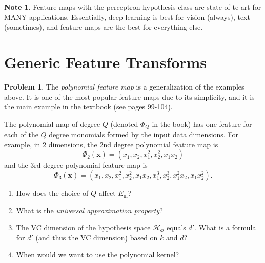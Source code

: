 \documentclass[10pt]{exam}
\theoremstyle{definition}
\newtheorem{problem}{Problem}
\newtheorem{note}{Note}
\newcommand{\Ein}{E_{\text{in}}}
\newcommand{\x}{\mathbf x}
\newcommand{\HH}[1]{\mathcal H_{\text{#1}}}
\begin{document}
\vspace{6in}
\begin{note}
    Feature maps with the perceptron hypothesis class are state-of-te-art for MANY applications.
    Essentially, deep learning is best for vision (always), text (sometimes), and feature maps are the best for everything else.
\end{note}

\newpage
\section*{Generic Feature Transforms}

\begin{problem}
    The \emph{polynomial feature map} is a generalization of the examples above.
    It is one of the most popular feature maps due to its simplicity,
    and it is the main example in the textbook (see pages 99-104).

    The polynomial map of degree $Q$ (denoted $\Phi_Q$ in the book) has one feature for each of the $Q$ degree monomials formed by the input data dimensions.
    For example, in 2 dimensions, the 2nd degree polynomial feature map is
    \begin{equation}
        \Phi_2(\x) = (x_1, x_2, x_1^2, x_2^2, x_1x_2)
    \end{equation}
    and the 3rd degree polynomial feature map is
    \begin{equation}
        \Phi_3(\x) = (x_1, x_2, x_1^2, x_2^2, x_1x_2, x_1^3, x_2^3, x_1^2x_2, x_1x_2^2)
        .
    \end{equation}
    \begin{enumerate}
        \item
            How does the choice of $Q$ affect $\Ein$?
            \vspace{3in}

        \item
            What is the \emph{universal approximation property}?
            \vspace{3in}

            \newpage
        \item
        The VC dimension of the hypothesis space $\HH{$\Phi$}$ equals $d'$.
        What is a formula for $d'$ (and thus the VC dimension) based on $k$ and $d$?
            \vspace{4in}


        \item
        When would we want to use the polynomial kernel?
    \end{enumerate}
\end{problem}
\end{document}
